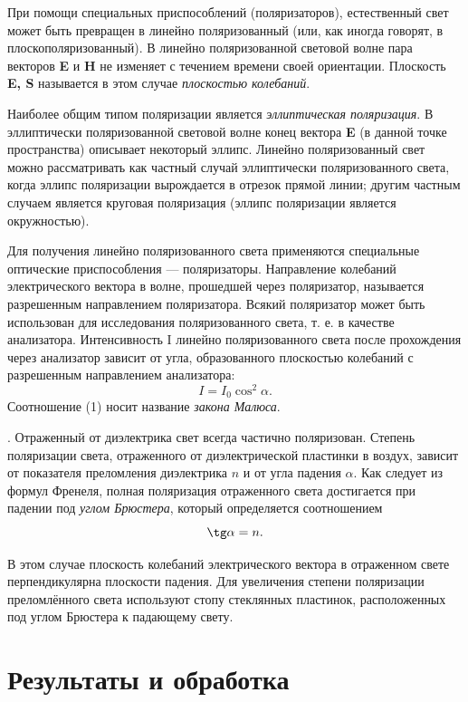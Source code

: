 При помощи специальных приспособлений (поляризаторов), естественный свет может быть превращен в линейно поляризованный (или, как иногда говорят, в плоскополяризованный). В линейно поляризованной световой волне пара векторов \textbf{E} и \textbf{H} не изменяет с течением времени своей ориентации. Плоскость \textbf{E, S} называется в этом случае \textit{плоскостью колебаний}. \par
Наиболее общим типом поляризации является \textit{эллиптическая поляризация}. В эллиптически поляризованной световой волне конец вектора
\textbf{E} (в данной точке пространства) описывает некоторый эллипс. Линейно
поляризованный свет можно рассматривать как частный случай эллиптически поляризованного света, когда эллипс поляризации вырождается в отрезок прямой линии; другим частным случаем является круговая
поляризация (эллипс поляризации является окружностью). \par
Для получения линейно поляризованного света применяются специальные оптические приспособления — поляризаторы. Направление колебаний электрического вектора в волне, прошедшей через поляризатор, называется
разрешенным направлением поляризатора.
Всякий поляризатор может быть использован для исследования поляризованного света, т. е. в качестве анализатора. Интенсивность I линейно поляризованного света после прохождения через анализатор зависит от угла, образованного плоскостью колебаний с разрешенным направлением анализатора:
\begin{equation}
  I = I_0 \cos^2\alpha.  
\end{equation}
Соотношение (1) носит название \textit{закона Малюса}. \par
. Отраженный от диэлектрика свет всегда частично поляризован. Степень поляризации света, отраженного от диэлектрической пластинки в воздух, зависит от показателя преломления диэлектрика $n$ и от угла падения $\alpha$. Как следует из формул Френеля, полная поляризация отраженного света достигается
при падении под \textit{углом Брюстера}, который определяется соотношением
\begin{equation}
 \tg \alpha = n.   
\end{equation}

В этом случае плоскость колебаний электрического вектора в отраженном свете перпендикулярна плоскости падения. Для увеличения степени поляризации преломлённого
света используют стопу стеклянных пластинок, расположенных под углом Брюстера к падающему свету.

\section*{Результаты и обработка}

